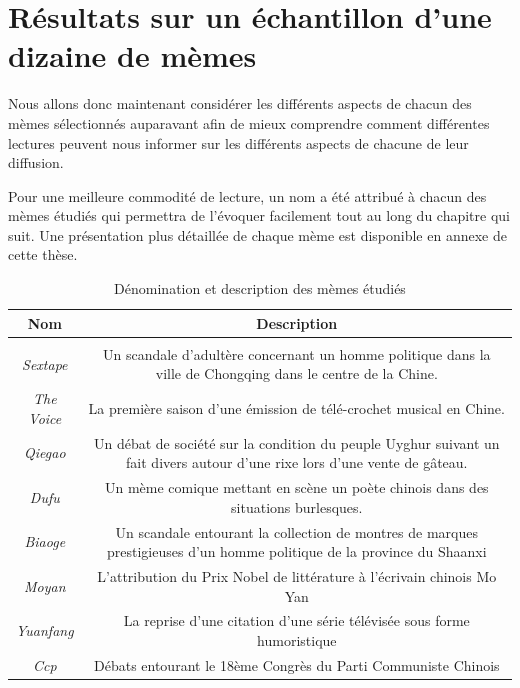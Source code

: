 \section{Résultats sur un échantillon d'une dizaine de mèmes}

Nous allons donc maintenant consid\'erer les diff\'erents aspects de chacun des m\`emes s\'electionn\'es auparavant afin de mieux comprendre comment diff\'erentes lectures peuvent nous informer sur les diff\'erents aspects de chacune de leur diffusion. 

Pour une meilleure commodit\'e de lecture, un nom a \'et\'e attribu\'e \`a chacun des m\`emes \'etudi\'es qui permettra de l{\textquoteright}\'evoquer facilement tout au long du chapitre qui suit. Une pr\'esentation plus d\'etaill\'ee de chaque m\`eme est disponible en annexe de cette th\`ese. 

\begin{table}[t]
  \begin{tabulary}{\textwidth}{c|C}

    \textbf{Nom} &
    \textbf{Description}\\
    \hline \\[-1.5ex]
    \textit{S}\textit{extape}\textit{ } &
    Un scandale d{\textquoteright}adult\`ere concernant un homme politique
    dans la ville de Chongqing dans le centre de la Chine.\\[2ex]

    \textit{The Voice } &
    La premi\`ere saison d{\textquoteright}une \'emission de
    t\'el\'e-crochet musical en Chine.\\[2ex]

    \textit{Qiegao } &
    Un d\'ebat de soci\'et\'e sur la condition du peuple Uyghur suivant un
    fait divers autour d{\textquoteright}une rixe lors
    d{\textquoteright}une vente de g\^ateau.\\[2ex]

    \textit{Dufu} &
    Un m\`eme comique mettant en sc\`ene un po\`ete chinois dans des
    situations burlesques.\\[2ex]

    \textit{Biaoge} &
    Un scandale entourant la collection de montres de marques prestigieuses
    d{\textquoteright}un homme politique de la province du Shaanxi \\[2ex]

    \textit{Moyan} &
    L{\textquoteright}attribution du Prix Nobel de litt\'erature \`a
    l{\textquoteright}\'ecrivain chinois Mo Yan\\[2ex]

    \textit{Yuanfang} &
    La reprise d{\textquoteright}une citation d{\textquoteright}une s\'erie
    t\'el\'evis\'ee sous forme humoristique\\[2ex]

    \textit{Ccp} &
    D\'ebats entourant le 18\`eme Congr\`es du Parti Communiste Chinois\\[2ex]

  \end{tabulary}
  \caption{D\'enomination et description des m\`emes \'etudi\'es}
\end{table}


